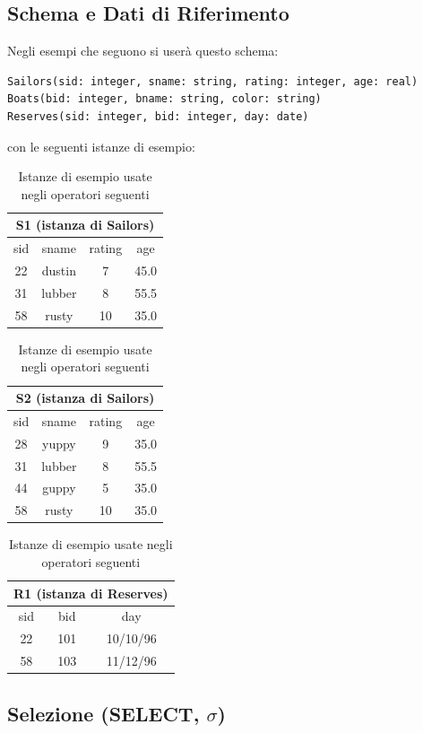 \documentclass[12pt, a4paper]{article}
\begin{document}
\subsection{Schema e Dati di Riferimento}

Negli esempi che seguono si userà questo schema:
\begin{verbatim}
Sailors(sid: integer, sname: string, rating: integer, age: real)
Boats(bid: integer, bname: string, color: string)
Reserves(sid: integer, bid: integer, day: date)
\end{verbatim}

con le seguenti istanze di esempio:

\begin{table}[H]
\centering
\begin{tabular}{@{}cccc@{}}
\toprule
\multicolumn{4}{c}{\textbf{S1} (istanza di Sailors)} \\
\midrule
sid & sname & rating & age \\
\midrule
22 & dustin & 7 & 45.0 \\
31 & lubber & 8 & 55.5 \\
58 & rusty & 10 & 35.0 \\
\bottomrule
\end{tabular}
\qquad
\begin{tabular}{@{}cccc@{}}
\toprule
\multicolumn{4}{c}{\textbf{S2} (istanza di Sailors)} \\
\midrule
sid & sname & rating & age \\
\midrule
28 & yuppy & 9 & 35.0 \\
31 & lubber & 8 & 55.5 \\
44 & guppy & 5 & 35.0 \\
58 & rusty & 10 & 35.0 \\
\bottomrule
\end{tabular}
\qquad
\begin{tabular}{@{}ccc@{}}
\toprule
\multicolumn{3}{c}{\textbf{R1} (istanza di Reserves)} \\
\midrule
sid & bid & day \\
\midrule
22 & 101 & 10/10/96 \\
58 & 103 & 11/12/96 \\
\bottomrule
\end{tabular}
\caption{Istanze di esempio usate negli operatori seguenti}
\end{table}

\subsection{Selezione (SELECT, $\sigma$)}
\end{document}
